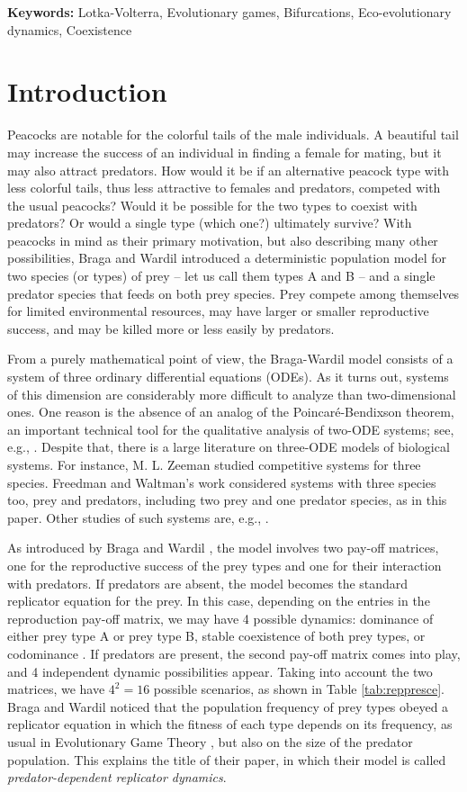 \documentclass[12pt]{article}
\theoremstyle{definition}
\begin{document}
	 \textbf{Keywords:} Lotka-Volterra, Evolutionary games, Bifurcations, Eco-evolutionary dynamics, Coexistence
	 
\section{Introduction}
Peacocks are notable for the colorful tails of the male individuals. A beautiful tail may increase the success of an individual in finding a female for mating, but it may also attract predators. How would it be if an alternative peacock type with less colorful tails, thus less attractive to females and predators, competed with the usual peacocks? Would it be possible for the two types to coexist with predators? Or would a single type (which one?) ultimately survive? With peacocks in mind as their primary motivation, but also describing many other possibilities, Braga and Wardil \cite{bw} introduced a deterministic population model for two species (or types) of prey -- let us call them types A and B -- and a single predator species that feeds on both prey species. Prey compete among themselves for limited environmental resources, may have larger or smaller reproductive success, and may be killed more or less easily by predators.

From a purely mathematical point of view, the Braga-Wardil model consists of a system of three ordinary differential equations (ODEs). As it turns out, systems of this dimension are considerably more difficult to analyze than two-dimensional ones. One reason is the absence of an analog of the Poincaré-Bendixson theorem, an important technical tool for the qualitative analysis of two-ODE systems; see, e.g., \cite{hirschsmaledevaney}. Despite that, there is a large literature on three-ODE models of biological systems. For instance, M. L. Zeeman \cite{zeeman} studied competitive systems for three species. Freedman and Waltman's work \cite{frewal} considered systems with three species too, prey and predators, including two prey and one predator species, as in this paper. Other studies of such systems are, e.g., \cite{adamu, koro, sharma, tripathi}.

As introduced by Braga and Wardil \cite{bw}, the model involves two pay-off matrices, one for the reproductive success of the prey types and one for their interaction with predators. If predators are absent, the model becomes the standard replicator equation \cite{tayjon, nowak} for the prey. 
In this case, depending on the entries in the reproduction pay-off matrix, we may have 4 possible dynamics: dominance of either prey type A or prey type B, stable coexistence of both prey types, or codominance \cite{nowak}. If predators are present, the second pay-off matrix comes into play, and 4 independent dynamic possibilities appear. Taking into account the two matrices, we have $4^2=16$ possible scenarios, as shown in Table \ref{tab:reppresce}. Braga and Wardil noticed that the population frequency of prey types obeyed a replicator equation in which the fitness of each type depends on its frequency, as usual in Evolutionary Game Theory \cite{hofsig, nowak}, but also on the size of the predator population. This explains the title of their paper, in which their model is called \emph{predator-dependent replicator dynamics}.
\end{document}
